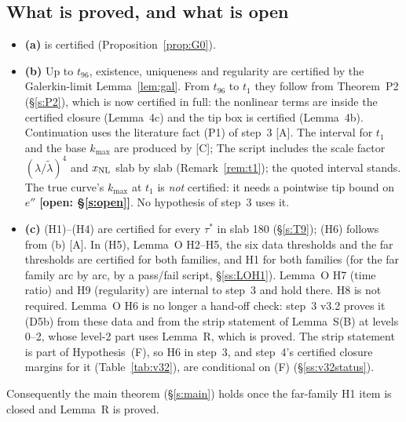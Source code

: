 \documentclass[11pt]{article}
\theoremstyle{definition}
\theoremstyle{remark}
\newcommand{\fn}[1]{\texttt{\detokenize{#1}}}
\newcommand{\tC}{\textnormal{\textsc{[C]}}}
\newcommand{\tA}{\textnormal{\textsc{[A]}}}
\newcommand{\OPEN}[1]{\textcolor{red!75!black}{\textbf{\textsf{[open: #1]}}}}
\begin{document}
\subsection{What is proved, and what is open}\label{ss:status}
\begin{itemize}
\item \textbf{(a)} is certified (Proposition~\ref{prop:G0}).
\item \textbf{(b)} Up to $t_{96}$, existence, uniqueness and regularity are certified by the Galerkin-limit Lemma~\ref{lem:gal}. From $t_{96}$ to $t_1$ they follow from Theorem~P2 (\S\ref{s:P2}), which is now certified in full: the nonlinear terms are inside the certified closure (Lemma~4c) and the tip box is certified (Lemma~4b). Continuation uses the literature fact (P1) of step~3 \tA. The interval for $t_1$ and the base $k_{\max}$ are produced by \fn{t1clock.py} \tC; The script includes the scale factor $(\lambda/\tilde\lambda)^4$ and $x_{\rm NL}$ slab by slab (Remark~\ref{rem:t1}); the quoted interval stands. The true curve's $k_{\max}$ at $t_1$ is \emph{not} certified: it needs a pointwise tip bound on $e''$ \OPEN{\S\ref{s:open}}. No hypothesis of step~3 uses it.
\item \textbf{(c)} (H1)--(H4) are certified for every $\tau^*$ in slab 180 (\S\ref{s:T9}); (H6) follows from (b) \tA. In (H5), Lemma~O H2--H5, the six data thresholds and the far thresholds are certified for both families, and H1 for both families (for the far family arc by arc, by a pass/fail script, \S\ref{ss:LOH1}). Lemma~O H7 (time ratio) and H9 (regularity) are internal to step~3 and hold there. H8 is not required. Lemma~O H6 is no longer a hand-off check: step~3 v3.2 proves it (D5b) from these data and from the strip statement of Lemma~S(B) at levels 0--2, whose level-2 part uses Lemma~R, which is proved. The strip statement is part of Hypothesis~(F), so H6 in step~3, and step~4's certified closure margins for it (Table~\ref{tab:v32}), are conditional on (F) (\S\ref{ss:v32status}).
\end{itemize}
Consequently the main theorem (\S\ref{s:main}) holds once the far-family H1 item is closed and Lemma~R is proved.
\end{document}
